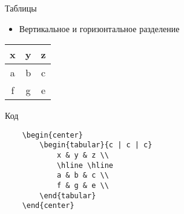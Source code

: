 \begin{frame}[fragile]{Таблицы}

\begin{itemize}
    \item Вертикальное и горизонтальное разделение
\end{itemize}

\begin{center}
    \begin{tabular}{c | c | c}
        x & y & z \\
        \hline \hline
        a & b & c \\
        f & g & e \\
    \end{tabular}
\end{center}

\begin{block}{Код}
    \begin{lstlisting}
    \begin{center}
        \begin{tabular}{c | c | c}
            x & y & z \\
            \hline \hline
            a & b & c \\
            f & g & e \\
        \end{tabular}
    \end{center}
    \end{lstlisting}
\end{block}

\end{frame}


